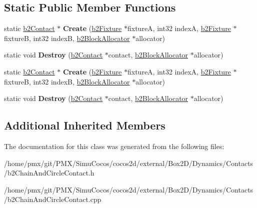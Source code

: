 \subsection*{Static Public Member Functions}
\begin{DoxyCompactItemize}
\item 
\mbox{\label{classb2ChainAndCircleContact_a9738f9b3eeddb824213abaae78ff6a73}} 
static \hyperlink{classb2Contact}{b2\+Contact} $\ast$ {\bfseries Create} (\hyperlink{classb2Fixture}{b2\+Fixture} $\ast$fixtureA, int32 indexA, \hyperlink{classb2Fixture}{b2\+Fixture} $\ast$fixtureB, int32 indexB, \hyperlink{classb2BlockAllocator}{b2\+Block\+Allocator} $\ast$allocator)
\item 
\mbox{\label{classb2ChainAndCircleContact_a1070fc727a3c52a160c7919c9650b4e3}} 
static void {\bfseries Destroy} (\hyperlink{classb2Contact}{b2\+Contact} $\ast$contact, \hyperlink{classb2BlockAllocator}{b2\+Block\+Allocator} $\ast$allocator)
\item 
\mbox{\label{classb2ChainAndCircleContact_a644e6d00b903534b5b00e76c52859ad8}} 
static \hyperlink{classb2Contact}{b2\+Contact} $\ast$ {\bfseries Create} (\hyperlink{classb2Fixture}{b2\+Fixture} $\ast$fixtureA, int32 indexA, \hyperlink{classb2Fixture}{b2\+Fixture} $\ast$fixtureB, int32 indexB, \hyperlink{classb2BlockAllocator}{b2\+Block\+Allocator} $\ast$allocator)
\item 
\mbox{\label{classb2ChainAndCircleContact_abe4320581520cd75b333200745f436b8}} 
static void {\bfseries Destroy} (\hyperlink{classb2Contact}{b2\+Contact} $\ast$contact, \hyperlink{classb2BlockAllocator}{b2\+Block\+Allocator} $\ast$allocator)
\end{DoxyCompactItemize}
\subsection*{Additional Inherited Members}


The documentation for this class was generated from the following files\+:\begin{DoxyCompactItemize}
\item 
/home/pmx/git/\+P\+M\+X/\+Simu\+Cocos/cocos2d/external/\+Box2\+D/\+Dynamics/\+Contacts/b2\+Chain\+And\+Circle\+Contact.\+h\item 
/home/pmx/git/\+P\+M\+X/\+Simu\+Cocos/cocos2d/external/\+Box2\+D/\+Dynamics/\+Contacts/b2\+Chain\+And\+Circle\+Contact.\+cpp\end{DoxyCompactItemize}
